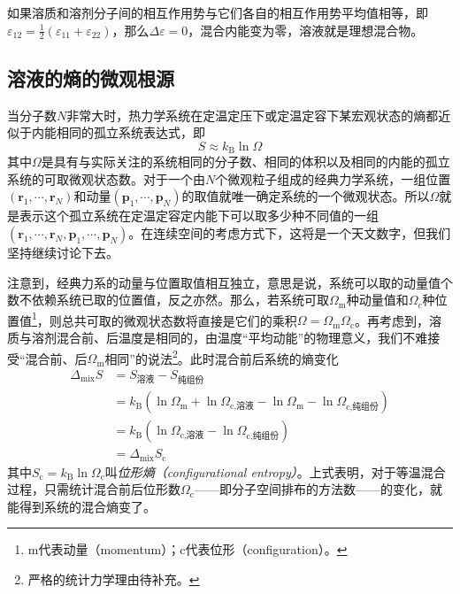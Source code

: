 \documentclass[main.tex]{subfiles}
\begin{document}
如果溶质和溶剂分子间的相互作用势与它们各自的相互作用势平均值相等，即$\varepsilon_{12}=\frac{1}{2}\left(\varepsilon_{11}+\varepsilon_{22}\right)$，那么$\Delta\varepsilon=0$，混合内能变为零，溶液就是理想混合物。

\subsection{溶液的熵的微观根源}
当分子数$N$非常大时，热力学系统在定温定压下或定温定容下某宏观状态的熵都近似于内能相同的孤立系统表达式，即
\[S\approx k_\text{B}\ln\Omega\]
其中$\Omega$是具有与实际关注的系统相同的分子数、相同的体积以及相同的内能的孤立系统的可取微观状态数。对于一个由$N$个微观粒子组成的经典力学系统，一组位置$\left(\mathbf{r}_1,\cdots,\mathbf{r}_N\right)$和动量$\left(\mathbf{p}_1,\cdots,\mathbf{p}_N\right)$的取值就唯一确定系统的一个微观状态。所以$\Omega$就是表示这个孤立系统在定温定容定内能下可以取多少种不同值的一组$\left(\mathbf{r}_1,\cdots,\mathbf{r}_N,\mathbf{p}_1,\cdots,\mathbf{p}_N\right)$。在连续空间的考虑方式下，这将是一个天文数字，但我们坚持继续讨论下去。

注意到，经典力系的动量与位置取值相互独立，意思是说，系统可以取的动量值个数不依赖系统已取的位置值，反之亦然。那么，若系统可取$\Omega_\text{m}$种动量值和$\Omega_c$种位置值\footnote{m代表动量（momentum）；c代表位形（configuration）。}，则总共可取的微观状态数将直接是它们的乘积$\Omega=\Omega_\text{m}\Omega_\text{c}$。再考虑到，溶质与溶剂混合前、后温度是相同的，由温度“平均动能”的物理意义，我们不难接受“混合前、后$\Omega_\text{m}$相同”的说法\footnote{严格的统计力学理由待补充。}。此时混合前后系统的熵变化
\[\begin{aligned}\Delta_\text{mix}S & =S_\text{溶液}-S_\text{纯组份}                                                                                  \\
                                  & =k_\text{B}\left(\ln\Omega_\text{m}+\ln\Omega_\text{c,溶液}-\ln\Omega_\text{m}-\ln\Omega_\text{c,纯组份}\right) \\
                                  & =k_\text{B}\left(\ln\Omega_\text{c,溶液}-\ln\Omega_\text{c,纯组份}\right)                                       \\
                                  & =\Delta_\text{mix}S_\text{c}\end{aligned}\]
其中$S_\text{c}=k_\text{B}\ln\Omega_\text{c}$叫\emph{位形熵（configurational entropy）}。上式表明，对于等温混合过程，只需统计混合前后位形数$\Omega_\text{c}$——即分子空间排布的方法数——的变化，就能得到系统的混合熵变了。
\end{document}
